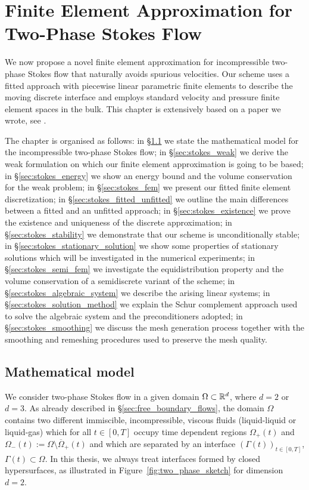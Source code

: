 \chapter[Two-Phase Stokes Flow FEM]
{\sc Finite Element Approximation for Two-Phase Stokes Flow}\label{ch:stokes}
We now propose a novel finite element approximation for incompressible
two-phase Stokes flow that naturally avoids spurious velocities. Our scheme uses
a fitted approach with piecewise linear parametric finite elements to describe
the moving discrete interface and employs standard velocity and pressure finite
element spaces in the bulk. This chapter is extensively based on a paper we
wrote, see \cite{stokesfitted}.

The chapter is organised as follows: in \S\ref{sec:stokes_model} we state the
mathematical model for the incompressible two-phase Stokes flow; in
\S\ref{sec:stokes_weak} we derive the weak formulation on which our finite
element approximation is going to be based; in \S\ref{sec:stokes_energy} we show
an energy bound and the volume conservation for the weak problem; in
\S\ref{sec:stokes_fem} we present our fitted finite element discretization; in
\S\ref{sec:stokes_fitted_unfitted} we outline the main differences between a
fitted and an unfitted approach; in \S\ref{sec:stokes_existence} we prove the
existence and uniqueness of the discrete approximation; in
\S\ref{sec:stokes_stability} we demonstrate that our scheme is unconditionally
stable; in \S\ref{sec:stokes_stationary_solution} we show some properties of
stationary solutions which will be investigated in the numerical experiments; in
\S\ref{sec:stokes_semi_fem} we investigate the equidistribution property and the
volume conservation of a semidiscrete variant of the scheme; in
\S\ref{sec:stokes_algebraic_system} we describe the arising linear systems; in
\S\ref{sec:stokes_solution_method} we explain the Schur complement approach used
to solve the algebraic system and the preconditioners adopted; in
\S\ref{sec:stokes_smoothing} we discuss the mesh generation process together
with the smoothing and remeshing procedures used to preserve the mesh quality.

\section{Mathematical model}\label{sec:stokes_model}
We consider two-phase Stokes flow in a given domain $\Omega\subset\mathbb R^d$, where
$d=2$ or $d=3$. As already described in \S\ref{sec:free_boundary_flows},
the domain $\Omega$ contains two different immiscible, incompressible, viscous
fluids (liquid-liquid or liquid-gas) which for all $t\in[0,T]$ occupy time
dependent regions $\Omega_+(t)$ and
$\Omega_-(t):=\Omega\setminus\overline{\Omega}_+(t)$ and which are separated by
an interface $(\Gamma(t))_{t\in[0,T]}$, $\Gamma(t)\subset\Omega$. In this
thesis, we always treat interfaces formed by closed hypersurfaces, as
illustrated in Figure~\ref{fig:two_phase_sketch} for dimension $d=2$.

